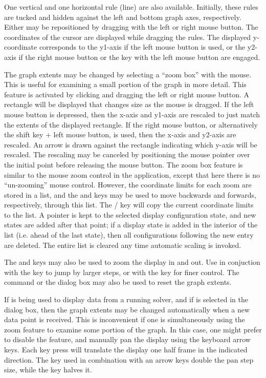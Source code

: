 One vertical and one horizontal rule (line) are also available.
Initially, these rules are tucked and hidden against the left and bottom
graph axes, respectively.  Either may be repositioned by dragging with
the left or right mouse button.  The coordinates of the cursor are
displayed while dragging the rules.  The displayed y-coordinate
corresponds to the y1-axis if the left mouse button is used, or the
y2-axis if the right mouse button or the  key with the left
mouse button are engaged.

The graph extents may be changed by selecting a ``zoom box'' with the
mouse.  This is useful for examining a small portion of the graph in
more detail.  This feature is activated by clicking and dragging the
left or right mouse button.  A rectangle will be displayed that changes
size as the mouse is dragged.  If the left mouse button is depressed,
then the x-axis and y1-axis are rescaled to just match the extents of
the displayed rectangle.  If the right mouse button, or alternatively
the shift key + left mouse button, is used, then the x-axis and y2-axis
are rescaled.  An arrow is drawn against the rectangle indicating which
y-axis will be rescaled.  The rescaling may be canceled by positioning
the mouse pointer over the initial point before releasing the mouse
button.  The zoom box feature is similar to the mouse zoom control in
the  application, except
that here there is no ``un-zooming'' mouse control.  However, the
coordinate limits for each zoom are stored in a list, and the 
and  keys may be used to move backwards and forwards,
respectively, through this list.  The / key will
copy the current coordinate limits to the list.  A pointer is kept to
the selected display configuration state, and new states are added after
that point; if a display state is added in the interior of the list
(i.e. ahead of the last state), then all configurations following the
new entry are deleted.  The entire list is cleared any time automatic
scaling is invoked.

The  and  keys may also be used to zoom the
display in and out.  Use in conjuction with the  key to jump
by larger steps, or with the  key for finer control.  The
 command or the
 dialog box may also be used to reset the
graph extents.

If  is being used to display data from a running solver,
and if  is selected in the
 dialog box, then the graph extents
may be changed automatically when a new data point is received.  This is
inconvenient if one is simultaneously using the zoom feature to examine
some portion of the graph.  In this case, one might prefer to disable
the  feature, and manually pan the display using the
keyboard arrow keys.  Each key press will translate the display one half
frame in the indicated direction.  The  key used in
combination with an arrow keys double the pan step size, while the
 key halves it.

